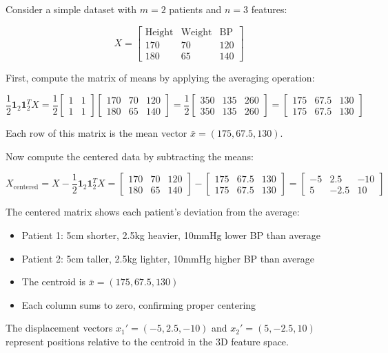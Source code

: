 \begin{notechapter}
Consider a simple dataset with $m = 2$ patients and $n = 3$ features:

\[
X = \begin{bmatrix}
\text{Height} & \text{Weight} & \text{BP} \\
170 & 70 & 120 \\  %
180 & 65 & 140     %
\end{bmatrix}
\]

First, compute the matrix of means by applying the averaging operation:

\[
\frac{1}{2}\mathbf{1}_2\mathbf{1}_2^T X = \frac{1}{2}
\begin{bmatrix}
1 & 1 \\
1 & 1
\end{bmatrix}
\begin{bmatrix}
170 & 70 & 120 \\
180 & 65 & 140
\end{bmatrix}
= \frac{1}{2}
\begin{bmatrix}
350 & 135 & 260 \\
350 & 135 & 260
\end{bmatrix}
= 
\begin{bmatrix}
175 & 67.5 & 130 \\
175 & 67.5 & 130
\end{bmatrix}
\]

Each row of this matrix is the mean vector $\bar{x} = (175, 67.5, 130)$.

Now compute the centered data by subtracting the means:

\[
X_{\text{centered}} = X - \frac{1}{2}\mathbf{1}_2\mathbf{1}_2^T X = 
\begin{bmatrix}
170 & 70 & 120 \\
180 & 65 & 140
\end{bmatrix}
- 
\begin{bmatrix}
175 & 67.5 & 130 \\
175 & 67.5 & 130
\end{bmatrix}
= 
\begin{bmatrix}
-5 & 2.5 & -10 \\
5 & -2.5 & 10
\end{bmatrix}
\]

\begin{remark}
The centered matrix shows each patient's deviation from the average:
\begin{itemize}
    \item Patient 1: 5cm shorter, 2.5kg heavier, 10mmHg lower BP than average
    \item Patient 2: 5cm taller, 2.5kg lighter, 10mmHg higher BP than average  
    \item The centroid is $\bar{x} = (175, 67.5, 130)$
    \item Each column sums to zero, confirming proper centering
\end{itemize}
The displacement vectors $x_1' = (-5, 2.5, -10)$ and $x_2' = (5, -2.5, 10)$ represent positions relative to the centroid in the 3D feature space.
\end{remark}


\end{notechapter}
